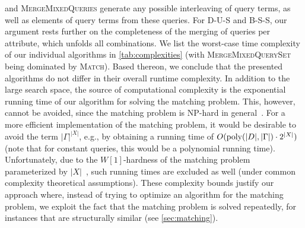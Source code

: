 and \textsc{MergeMixedQueries} generate any possible interleaving of query
terms, as well as elements of query terms from these queries. For D-U-S and
B-S-S, our argument rests further on the completeness of
the merging of queries per attribute, which unfolds all combinations.
We list the worst-case time complexity of our individual
algorithms in \autoref{tab:complexities} (with \textsc{MergeMixedQuerySet}
being dominated by \textsc{Match}). Based thereon, we conclude that the
presented algorithms do not differ in their overall runtime complexity.
In addition to the large search space, the source of computational
complexity is the exponential running time of our algorithm for solving the
matching problem.
This, however, cannot be
avoided, since the matching problem is NP-hard in general~\cite{icdt2022}.
For a more efficient
implementation of the matching problem, it would be desirable to avoid
the term $|\Gamma|^{|X|}$, e.g., by obtaining a running time
of $O(\operatorname{\textup{poly}}(|D|, |\Gamma|) \cdot 2^{|X|})$ (note that for
constant queries, this would be a polynomial running time). Unfortunately,
due to the $W[1]$-hardness of the matching problem parameterized by
$|X|$~\cite{icdt2022}, such running times are excluded as well (under common
complexity theoretical assumptions).
These complexity bounds justify our approach where, instead of trying
to optimize an algorithm for the matching problem, we exploit
the fact that the matching problem is solved repeatedly, for
instances that are structurally similar (see \autoref{sec:matching}).